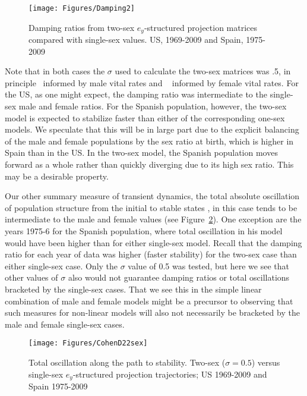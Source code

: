 \begin{figure}[ht!]
        \centering  
        
        
          \caption{Damping ratios from two-sex $e_y$-structured projection
          matrices compared with single-sex values. US, 1969-2009 and Spain,
          1975-2009}
           \texttt{[image: Figures/Damping2]}
          \label{fig:damping2}
\end{figure}
Note that in both cases the $\sigma$ used to calculate the two-sex matrices was
.5, in principle \textonehalf~informed by male vital rates and \textonehalf~
informed by female vital rates. For the US, as one might expect, the damping
ratio was intermediate to the single-sex male and female ratios. For
the Spanish population, however, the two-sex model is expected to stabilize
faster than either of the corresponding one-sex models. We speculate that this
will be in large part due to the explicit balancing of the male and female
populations by the sex ratio at birth, which is higher in Spain than in the US. 
In the two-sex model, the Spanish population moves forward as a whole rather 
than quickly diverging due to its high sex ratio. This may be a desirable
property.

Our other summary measure of transient dynamics, the total absolute
oscillation of population structure from the initial to stable states
\citep{cohen1979cumulative}, in this case tends to be intermediate to the male
and female values (see Figure~\ref{fig:cohend22sex}). One exception are the
years 1975-6 for the Spanish population, where total oscillation in his model
would have been higher than for either single-sex model. Recall that the damping
ratio for each year of data was higher (faster stability) for the two-sex case 
than either single-sex case. Only the $\sigma$ value of 0.5 was tested, but here
we see that other values of $\sigma$ also would not guarantee damping ratios or
total oscillations bracketed by the single-sex cases. That we see this in the
simple linear combination of male and female models might be a precursor to
observing that such measures for non-linear models will also not necessarily be
bracketed by the male and female single-sex cases.

\begin{figure}[ht!]
        \centering  
          \caption{Total oscillation along the path to
       stability. Two-sex ($\sigma = 0.5$) versus single-sex $e_y$-structured
       projection trajectories; US 1969-2009 and Spain 1975-2009}
           \texttt{[image: Figures/CohenD22sex]}
          \label{fig:cohend22sex}
\end{figure}
 \FloatBarrier





